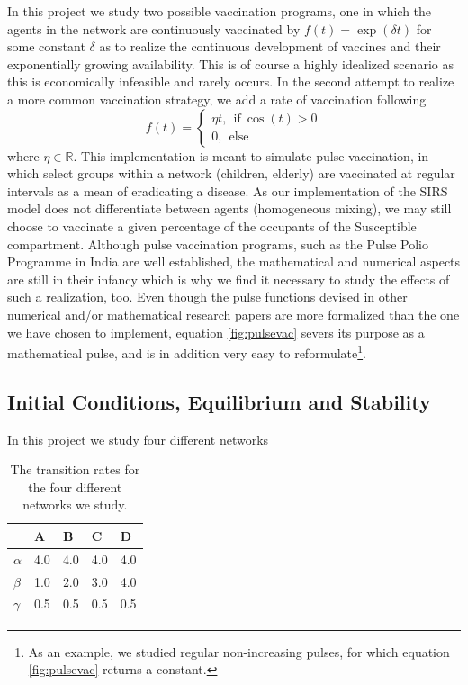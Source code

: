 In this project we study two possible vaccination programs, one in which the agents in the network are continuously vaccinated by $f(t) = \exp(\delta t)$ for some constant $\delta$ as to realize the continuous development of vaccines and their exponentially growing availability. This is of course a highly idealized scenario as this is economically infeasible and rarely occurs. In the second attempt to realize a more common vaccination strategy, we add a rate of vaccination following
\begin{equation}
f(t) = 
    \begin{cases}
    \eta t, \ \ \text{if} \ \cos(t) > 0\\
    0, \ \ \text{else}
    \end{cases}
    \label{fig:pulsevac}
\end{equation}
where $\eta \in \mathbb{R}$. This implementation is meant to simulate pulse vaccination, in which select groups within a network (children, elderly) are vaccinated at regular intervals as a mean of eradicating a disease. As our implementation of the SIRS model does not differentiate between agents (homogeneous mixing), we may still choose to vaccinate a given percentage of the occupants of the Susceptible compartment. Although pulse vaccination programs, such as the Pulse Polio Programme in India are well established, the mathematical and numerical aspects are still in their infancy which is why we find it necessary to study the effects of such a realization, too. Even though the pulse functions devised in other numerical and/or mathematical research papers are more formalized than the one we have chosen to implement, equation \ref{fig:pulsevac} severs its purpose as a mathematical pulse, and is in addition very easy to reformulate\footnote{As an example, we studied regular non-increasing pulses, for which equation \ref{fig:pulsevac} returns a constant.}.\\
\newpage
\subsection{Initial Conditions, Equilibrium and Stability}
In this project we study four different networks

\begin{table}[H]
    \centering
    \begin{tabular}{l|l|l|l|l}
         & A & B & C & D\\
         \hline
         $\alpha$ & 4.0 & 4.0 & 4.0 & 4.0\\
         $\beta$ & 1.0 & 2.0 & 3.0 & 4.0\\
         $\gamma$ &0.5 &0.5 &0.5 &0.5\\
    \end{tabular}
    \caption{The transition rates for the four different networks we study.}
    \label{tab:initconditions}
\end{table}

